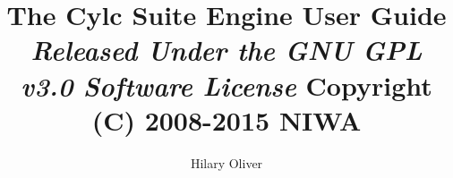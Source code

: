 \documentclass[11pt,a4paper,titlepage]{article}
\title{The Cylc Suite Engine\linebreak
User Guide \linebreak
{\em \small
} \linebreak
{\em \small Released Under the GNU GPL v3.0 Software License} \linebreak
{\small Copyright (C) 2008-2015 NIWA}}
\author{Hilary Oliver}
\begin{document}
\maketitle

\pagebreak



\pagebreak
\tableofcontents
\listoffigures

\pagebreak

\end{document}
